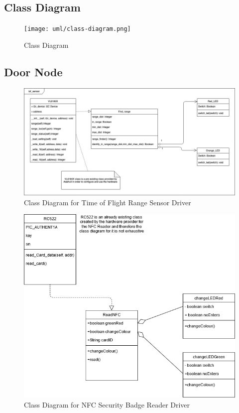 \subsection{Class Diagram}

\begin{figure}[!htb]
\centering
\texttt{[image: uml/class-diagram.png]}
\caption{Class Diagram}
\label{fig:class-diagram}
\end{figure}

\subsection{Door Node}

\begin{figure}[!htb]
\centering
\includegraphics[width=\textwidth]{images/tof-driver-class-dia.png}
\caption{Class Diagram for Time of Flight Range Sensor Driver}
\end{figure}

\begin{figure}[!htb]
\centering
\includegraphics[width=\textwidth]{images/nfc-driver-class-dia.png}
\caption{Class Diagram for NFC Security Badge Reader Driver}
\end{figure}

